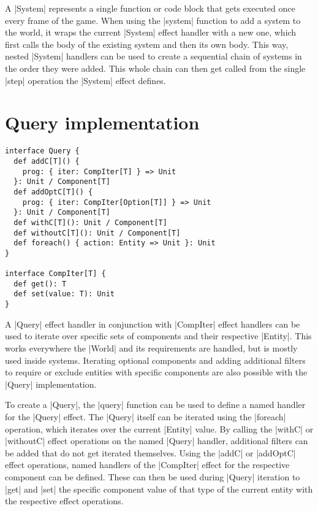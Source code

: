 A |System| represents a single function or code block that gets executed once every frame of the game. When using the |system| function to add a system to the world, it wraps the current |System| effect handler with a new one, which first calls the body of the existing system and then its own body. This way, nested |System| handlers can be used to create a sequential chain of systems in the order they were added. This whole chain can then get called from the single |step| operation the |System| effect defines.

\section{Query implementation}

\begin{lstlisting}[caption=Query and CompIter signitures]
interface Query {
  def addC[T]() {
    prog: { iter: CompIter[T] } => Unit
  }: Unit / Component[T]
  def addOptC[T]() {
    prog: { iter: CompIter[Option[T]] } => Unit
  }: Unit / Component[T]
  def withC[T](): Unit / Component[T]
  def withoutC[T](): Unit / Component[T]
  def foreach() { action: Entity => Unit }: Unit
}

interface CompIter[T] {
  def get(): T
  def set(value: T): Unit
}
\end{lstlisting}

A |Query| effect handler in conjunction with |CompIter| effect handlers can be used to iterate over specific sets of components and their respective |Entity|. This works everywhere the |World| and its requirements are handled, but is mostly used inside systems. Iterating optional components and adding additional filters to require or exclude entities with specific components are also possible with the |Query| implementation.

To create a |Query|, the |query| function can be used to define a named handler for the |Query| effect. The |Query| itself can be iterated using the |foreach| operation, which iterates over the current |Entity| value. By calling the |withC| or |withoutC| effect operations on the named |Query| handler, additional filters can be added that do not get iterated themselves. Using the |addC| or |addOptC| effect operations, named handlers of the |CompIter| effect for the respective component can be defined. These can then be used during |Query| iteration to |get| and |set| the specific component value of that type of the current entity with the respective effect operations.

